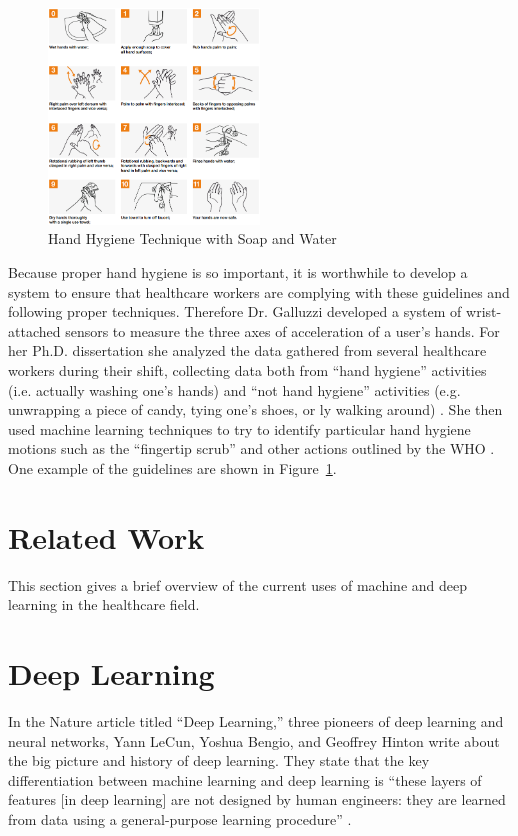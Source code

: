 \documentclass[]{report}
\begin{document}
\begin{figure}
	\centering
	\includegraphics[width=0.5\textwidth]{../images/handhygiene-summary}
	\caption{Hand Hygiene Technique with Soap and Water \cite{who2}}
	\label{hh-guidelines}
\end{figure}

Because proper hand hygiene is so important, it is worthwhile to develop a system to ensure that healthcare workers are complying with these guidelines and following proper techniques. Therefore Dr. Galluzzi developed a system of wrist-attached sensors to measure the three axes of acceleration of a user's hands. For her Ph.D. dissertation she analyzed the data gathered from several healthcare workers during their shift, collecting data both from ``hand hygiene'' activities (i.e. actually washing one's hands) and ``not hand hygiene'' activities (e.g. unwrapping a piece of candy, tying one's shoes, or ly walking around) \cite{Galluzzi}. She then used machine learning techniques to try to identify particular hand hygiene motions such as the ``fingertip scrub'' and other actions outlined by the WHO \cite{Galluzzi}. One example of the guidelines are shown in Figure~\ref{hh-guidelines}.




\section{Related Work}

This section gives a brief overview of the current uses of machine and deep learning in the healthcare field.


\section{Deep Learning}

In the Nature article titled ``Deep Learning,'' three pioneers of deep learning and neural networks, Yann LeCun, Yoshua Bengio, and Geoffrey Hinton write about the big picture and history of deep learning. They state that the key differentiation between machine learning and deep learning is ``these layers of features [in deep learning] are not designed by human engineers: they are learned from data using a general-purpose learning procedure'' \cite{ThreeGiants}. 
\end{document}
